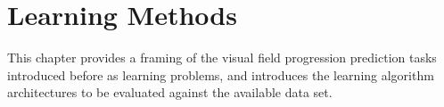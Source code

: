 \chapter{Learning Methods}

This chapter provides a framing of the visual field progression prediction tasks introduced before as learning problems, and introduces the learning algorithm architectures to be evaluated against the available data set. 
